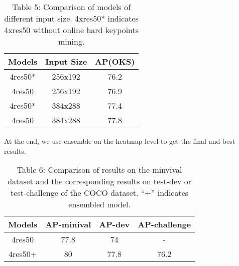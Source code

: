 \captionsetup[table]{labelformat=empty}
\begin{table}[!hbp]
  \centering
  \begin{tabular}{|c|c|c|}
  \hline
  Models          & Input Size & AP(OKS)   \\
  \hline
  4res50* & 256x192 & 76.2 \\
  \hline
  4res50 & 256x192 & 76.9  \\
  \hline
  4res50* & 384x288 & 77.4  \\
  \hline
  4res50 & 384x288 & 77.8  \\
  \hline
  \end{tabular}
  \caption{Table 5: Comparison of models of different input size. 4xres50* indicates 4xres50 without online hard keypoints mining.}
\end{table}

At the end, we use ensemble on the heatmap level to get the final and best results.

\captionsetup[table]{labelformat=empty}
\begin{table}[!hbp]
  \centering
  \begin{tabular}{|c|c|c|c|}
  \hline
  Models          & AP-minival & AP-dev & AP-challenge  \\
  \hline
  4res50 & 77.8 & 74  & - \\
  \hline
  4res50+ & 80 & 77.8 & 76.2  \\
  \hline
  \end{tabular}
  \caption{Table 6: Comparison of results on the minvival dataset and the corresponding results on test-dev or test-challenge of the COCO
dataset. “+” indicates ensembled model.}
\end{table}


